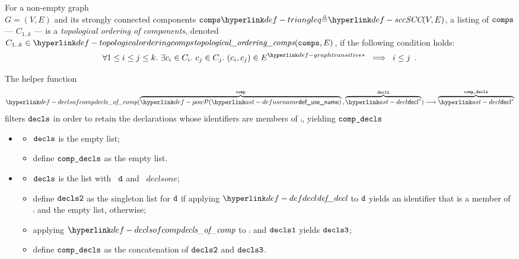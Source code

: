 \hypertarget{def-topologicalorderingcomps}{}
\begin{definition}
For a non-empty graph \\
$G=(V, E)$ and its strongly connected components $\comps \triangleq \SCC(V, E)$,
a listing of $\texttt{comps}$ ---
$C_{1..k}$ --- is a \emph{topological ordering of components},
denoted \\
$C_{1..k} \in \topologicalorderingcomps(\comps, E)$, if the following condition holds:
\[
  \forall 1 \leq i \leq j \leq k.\ \exists c_i\in C_i.\ c_j\in C_j.\ (c_i,c_j) \in \graphtransitive{E} \;\;\Longrightarrow\;\;
  i \leq j \enspace .
\]
\end{definition}

\hypertarget{def-declsofcomp}{}
The helper function
\[
\declsofcomp(
  \overname{\pow{\defusename}}{\comp} \aslsep
  \overname{\decl^*}{\decls}
) \aslto \overname{\decl^*}{\compdecls}
\]
filters $\texttt{decls}$ in order to retain the declarations whose identifiers are members of $\comp$,
yielding $\texttt{comp\_decls}$

\ProseParagraph
\OneApplies
\begin{itemize}
  \item {}
  \begin{itemize}
    \item $\texttt{decls}$ is the empty list;
    \item define $\texttt{comp\_decls}$ as the empty list.
  \end{itemize}

  \item {}
  \begin{itemize}
    \item $\texttt{decls}$ is the list with \head\ $\texttt{d}$ and \tail\ $declsone$;
    \item define $\texttt{decls2}$ as the singleton list for $\texttt{d}$ if applying $\defdecl$ to $\texttt{d}$ yields an identifier
          that is a member of $\comp$ and the empty list, otherwise;
    \item applying $\declsofcomp$ to $\comp$ and $\texttt{decls1}$ yields $\texttt{decls3}$;
    \item define $\texttt{comp\_decls}$ as the concatenation of $\texttt{decls2}$ and $\texttt{decls3}$.
  \end{itemize}
\end{itemize}

\FormallyParagraph
{}


